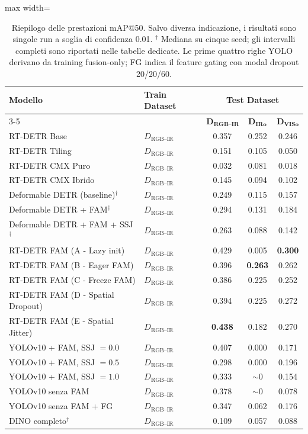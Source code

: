 \documentclass[a4paper,11pt]{article}
\begin{document}
\begin{table}[H]
\centering
\caption{Riepilogo delle prestazioni mAP@50. Salvo diversa indicazione, i risultati sono singole run a soglia di confidenza 0.01. $^\dagger$ Mediana su cinque seed; gli intervalli completi sono riportati nelle tabelle dedicate. Le prime quattro righe YOLO derivano da training fusion-only; FG indica il feature gating con modal dropout 20/20/60.}
\label{tab:summary_rtdetr_onwards}
\begin{adjustbox}{max width=\textwidth}
\begin{tabular}{llccc}
\toprule
\multirow{2}{*}{\textbf{Modello}} & \multirow{2}{*}{\textbf{Train Dataset}} & \multicolumn{3}{c}{\textbf{Test Dataset}} \\
\cmidrule(lr){3-5}
& & $\boldsymbol{D_{\text{RGB--IR}}}$ & $\boldsymbol{D_{\text{IRo}}}$ & $\boldsymbol{D_{\text{VISo}}}$ \\
\midrule
RT-DETR Base & $D_{\text{RGB--IR}}$ & 0.357 & 0.252 & 0.246 \\
RT-DETR Tiling & $D_{\text{RGB--IR}}$ & 0.151 & 0.105 & 0.050 \\
RT-DETR CMX Puro & $D_{\text{RGB--IR}}$ & 0.032 & 0.081 & 0.018 \\
RT-DETR CMX Ibrido & $D_{\text{RGB--IR}}$ & 0.145 & 0.094 & 0.102 \\
Deformable DETR (baseline)$^\dagger$ & $D_{\text{RGB--IR}}$ & 0.249 & 0.115 & 0.157 \\
Deformable DETR + FAM$^\dagger$ & $D_{\text{RGB--IR}}$ & 0.294 & 0.131 & 0.184 \\
Deformable DETR + FAM + SSJ$^\dagger$ & $D_{\text{RGB--IR}}$ & 0.263 & 0.088 & 0.142 \\
RT-DETR FAM (A - Lazy init) & $D_{\text{RGB--IR}}$ & 0.429 & 0.005 & \textbf{0.300} \\
RT-DETR FAM (B - Eager FAM) & $D_\text{RGB--IR}$ & 0.396 & \textbf{0.263} & 0.262 \\
RT-DETR FAM (C - Freeze FAM) & $D_\text{RGB--IR}$ & 0.386 & 0.225 & 0.252 \\
RT-DETR FAM (D - Spatial Dropout) & $D_\text{RGB--IR}$ & 0.394 & 0.225 & 0.272 \\
RT-DETR FAM (E - Spatial Jitter) & $D_{\text{RGB--IR}}$ & \textbf{0.438} & 0.182 & 0.270 \\
\midrule
YOLOv10 + FAM, SSJ $=0.0$ & $D_{\text{RGB--IR}}$ & 0.407 & 0.000 & 0.171 \\
YOLOv10 + FAM, SSJ $=0.5$ & $D_{\text{RGB--IR}}$ & 0.298 & 0.000 & 0.196 \\
YOLOv10 + FAM, SSJ $=1.0$ & $D_{\text{RGB--IR}}$ & 0.333 & $\sim0$ & 0.154 \\
YOLOv10 senza FAM & $D_{\text{RGB--IR}}$ & 0.378 & $\sim0$ & 0.078 \\
YOLOv10 senza FAM + FG & $D_{\text{RGB--IR}}$ & 0.347 & 0.062 & 0.176 \\
\midrule
DINO completo$^\dagger$ & $D_{\text{RGB--IR}}$ & 0.109 & 0.057 & 0.088 \\
\bottomrule
\end{tabular}
\end{adjustbox}
\end{table}
\end{document}

